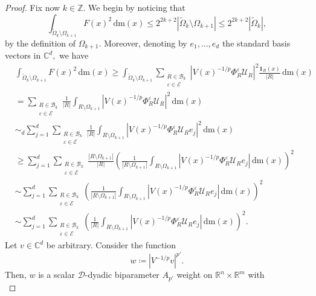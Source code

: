 \documentclass{article}
\theoremstyle{definition}
\theoremstyle{remark}
\numberwithin{equation}{section}
\newcommand{\mathdm}{\,\mathrm{dm}}
\newcommand{\cB}{\mathcal{B}}
\newcommand{\cE}{\mathcal{E}}
\newcommand{\cU}{\mathcal{U}}
\newcommand{\bfD}{\bm{\mathcal{D}}}
\newcommand{\e}{\varepsilon}
\newcommand{\integer}{\mathbb{Z}}
\newcommand{\reals}{\mathbb{R}}
\newcommand{\complex}{\mathbb{C}}
\newcommand{\1}{\mathbf{1}}
\begin{document}
\begin{proof}
        Fix now $k\in\integer.$ We begin by noticing that
        \begin{equation*}
            \int_{\widetilde{\Omega}_k\setminus\Omega_{k+1}}F(x)^2\mathdm(x)\leq 2^{2k+2}|\widetilde{\Omega}_k\setminus\Omega_{k+1}|\leq 2^{2k+2}|\widetilde{\Omega}_k|,
        \end{equation*}
        by the definition of $\Omega_{k+1}.$ Moreover, denoting by $e_1,\ldots,e_d$ the standard basis vectors in $\complex^{d},$ we have
        \begin{align}
            \label{FSquaredLower}
            &\int_{\widetilde{\Omega}_k\setminus\Omega_{k+1}}F(x)^2\mathdm(x)\geq
            \int_{\widetilde{\Omega}_k\setminus\Omega_{k+1}}\sum_{\substack{R\in\cB_k\\\e\in\cE}}|V(x)^{-1/p}\Phi_{R}^{\e}\cU_{R}|^2\frac{\1_{R}(x)}{|R|}\mathdm(x)\\
            &=\sum_{\substack{R\in\cB_k\\\e\in\cE}}\frac{1}{|R|}\int_{R\setminus\Omega_{k+1}}|V(x)^{-1/p}\Phi_{R}^{\e}\cU_{R}|^2\mathdm(x)\\
            &\sim_{d}\sum_{j=1}^{d}\sum_{\substack{R\in\cB_k\\\e\in\cE}}\frac{1}{|R|}\int_{R\setminus\Omega_{k+1}}|V(x)^{-1/p}\Phi_{R}^{\e}\cU_{R}e_{j}|^2\mathdm(x)\\
            &\geq\sum_{j=1}^{d}\sum_{\substack{R\in\cB_k\\\e\in\cE}}\frac{|R\setminus\Omega_{k+1}|}{|R|}\left(\frac{1}{|R\setminus\Omega_{k+1}|}\int_{R\setminus\Omega_{k+1}}|V(x)^{-1/p}\Phi_{R}^{\e}\cU_{R}e_{j}|\mathdm(x)\right)^2\\
            &\sim\sum_{j=1}^{d}\sum_{\substack{R\in\cB_k\\\e\in\cE}}\left(\frac{1}{|R\setminus\Omega_{k+1}|}\int_{R\setminus\Omega_{k+1}}|V(x)^{-1/p}\Phi_{R}^{\e}\cU_{R}e_{j}|\mathdm(x)\right)^2\\
            &\sim\sum_{j=1}^{d}\sum_{\substack{R\in\cB_k\\\e\in\cE}}\left(\frac{1}{|R|}\int_{R\setminus\Omega_{k+1}}|V(x)^{-1/p}\Phi_{R}^{\e}\cU_{R}e_{j}|\mathdm(x)\right)^2.
        \end{align}
        Let $v\in\complex^d$ be arbitrary. Consider the function
        \begin{equation*}
            w\coloneq |V^{-1/p}v|^{p'}.
        \end{equation*}
        Then, $w$ is a scalar $\bfD$-dyadic biparameter $A_{p'}$ weight on $\reals^n\times\reals^m$ with
        \begin{equation*}

\end{equation*}
\end{proof}
\end{document}
